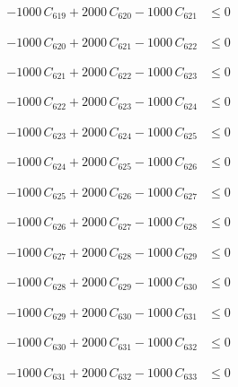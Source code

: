 \documentclass[a4paper,11pt]{article}
\begin{document}
\begin{align}
-1000\,C_{619} + 2000\,C_{620} - 1000\,C_{621} &\leq 0 \nonumber
\end{align}

\begin{align}
-1000\,C_{620} + 2000\,C_{621} - 1000\,C_{622} &\leq 0 \nonumber
\end{align}

\begin{align}
-1000\,C_{621} + 2000\,C_{622} - 1000\,C_{623} &\leq 0 \nonumber
\end{align}

\begin{align}
-1000\,C_{622} + 2000\,C_{623} - 1000\,C_{624} &\leq 0 \nonumber
\end{align}

\begin{align}
-1000\,C_{623} + 2000\,C_{624} - 1000\,C_{625} &\leq 0 \nonumber
\end{align}

\begin{align}
-1000\,C_{624} + 2000\,C_{625} - 1000\,C_{626} &\leq 0 \nonumber
\end{align}

\begin{align}
-1000\,C_{625} + 2000\,C_{626} - 1000\,C_{627} &\leq 0 \nonumber
\end{align}

\begin{align}
-1000\,C_{626} + 2000\,C_{627} - 1000\,C_{628} &\leq 0 \nonumber
\end{align}

\begin{align}
-1000\,C_{627} + 2000\,C_{628} - 1000\,C_{629} &\leq 0 \nonumber
\end{align}

\begin{align}
-1000\,C_{628} + 2000\,C_{629} - 1000\,C_{630} &\leq 0 \nonumber
\end{align}

\begin{align}
-1000\,C_{629} + 2000\,C_{630} - 1000\,C_{631} &\leq 0 \nonumber
\end{align}

\begin{align}
-1000\,C_{630} + 2000\,C_{631} - 1000\,C_{632} &\leq 0 \nonumber
\end{align}

\begin{align}
-1000\,C_{631} + 2000\,C_{632} - 1000\,C_{633} &\leq 0 \nonumber
\end{align}
\end{document}
